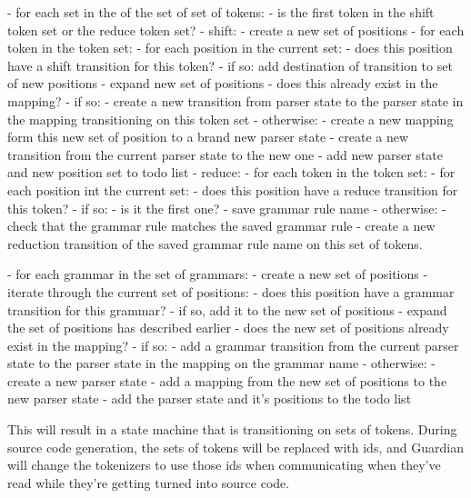{{			- for each set in the of the set of set of tokens:
				- is the first token in the shift token set or the reduce token set?
				- shift:
					- create a new set of positions
					- for each token in the token set:
						- for each position in the current set:
							- does this position have a shift transition for this token?
							- if so: add destination of transition to set of new
								positions
					- expand new set of positions
					- does this already exist in the mapping?
					- if so:
						- create a new transition from parser state to the parser
							state in the mapping transitioning on this token set
					- otherwise:
						- create a new mapping form this new set of position
							to a brand new parser state
						- create a new transition from the current parser
							state to the new one
						- add new parser state and new position set to todo list
				- reduce:
					- for each token in the token set:
						- for each position int the current set:
							- does this position have a reduce transition for this
								token?
							- if so:
								- is it the first one?
									- save grammar rule name
								- otherwise:
									- check that the grammar rule matches
										the saved grammar rule
					- create a new reduction transition of the saved grammar
						rule name on this set of tokens.
			
			- for each grammar in the set of grammars:
				- create a new set of positions
				- iterate through the current set of positions:
					- does this position have a grammar transition for this grammar?
					- if so, add it to the new set of positions
				- expand the set of positions has described earlier
				- does the new set of positions already exist in the mapping?
				- if so:
					- add a grammar transition from the current parser state
						to the parser state in the mapping on the grammar name
				- otherwise:
					- create a new parser state
					- add a mapping from the new set of positions to the new
						parser state
					- add the parser state and it's positions to the todo list

		This will result in a state machine that is transitioning on sets of tokens.
		During source code generation, the sets of tokens will be replaced with
		ids, and Guardian will change the tokenizers to use those ids when
		communicating when they've read while they're getting turned into source
		code.
	}
}
















